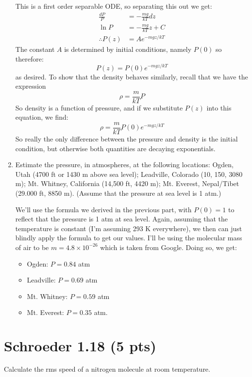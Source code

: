 \documentclass[11pt]{article}
\begin{document}
\begin{enumerate}[label=\alph*)]
			\begin{solution}
				This is a first order separable ODE, so separating this out we get:
				\begin{align*}
					\frac{dP}{P} &= -\frac{mg}{kT}dz\\
					\ln P &= -\frac{mg}{kT}z + C\\
					\therefore P(z) &= Ae^{-mgz / kT}
				\end{align*}
				The constant $A$ is determined by initial conditions, namely $P(0)$ so therefore:
				\[
					P(z) = P(0)e^{-mgz / kT}
				\] 
				as desired. To show that the density behaves similarly, recall that we have the expression
				\[
				\rho = \frac{m}{kT} P 
				\] 
				So density is a function of pressure, and if we substitute $P(z)$ into this equation, we 
				find:
				\[
					\rho = \frac{m}{kT} P(0) e^{-mgz / kT}
				\] 
				So really the only difference between the pressure and density is the initial condition, but 
				otherwise both quantities are decaying exponentials.
			\end{solution}
		\item Estimate the pressure, in atmospheres, at the following locations: Ogden, Utah (4700 ft or 1430
			m above sea level); Leadville, Colorado (10, 150, 3080 m); Mt. Whitney, California (14,500 ft, 4420
			m); Mt. Everest, Nepal/Tibet (29.000 ft, 8850 m). (Assume that the pressure at sea level is 1 atm.)

			\begin{solution}
				We'll use the formula we derived in the previous part, with $P(0) = 1$ to reflect that 
				the pressure is 1 atm at sea level. Again, assuming that the temperature is constant (I'm 
				assuming 293 K everywhere), we 
				then can just blindly apply the formula to get our values. I'll be using the molecular mass 
				of air to be $m = 4.8 \times 10^{-26}$ which is taken from Google. Doing so, we get:
				\begin{itemize}
					\item Ogden: $P = 0.84$ atm
					\item Leadville: $P = 0.69$ atm
					\item Mt. Whitney: $P = 0.59$ atm
					\item Mt. Everest: $P = 0.35$ atm. 
				\end{itemize}
			\end{solution}
	\end{enumerate}
	\pagebreak
	\section*{Schroeder 1.18 (5 pts)}
	Calculate the rms speed of a nitrogen molecule at room temperature. 
\end{document}
